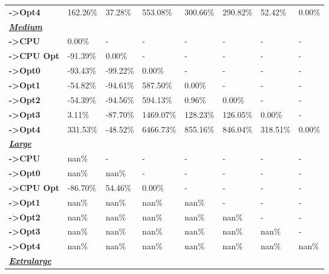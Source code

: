 \begin{table}[H]
\begin{tabular}{llllllll}
    \rowcolor[HTML]{EFEFEF} \cellcolor[HTML]{DAE8FC} \textbf{->Opt4} & 162.26\% & 37.28\% & 553.08\% & 300.66\% & 290.82\% & 	52.42\% & 	0.00\% \\
    \cellcolor[HTML]{DAE8FC} \textbf{\textbf{{\emph{{\underline{{Medium}}}}}}} &  &  &  &  &  &  &  \\
    \rowcolor[HTML]{EFEFEF} \cellcolor[HTML]{DAE8FC} \textbf{->CPU} & 0.00\% & - & - & - & - & - & - \\
    \cellcolor[HTML]{DAE8FC} \textbf{->CPU Opt} & -91.39\% & 0.00\% & - & - & - & - & - \\
    \rowcolor[HTML]{EFEFEF} \cellcolor[HTML]{DAE8FC} \textbf{->Opt0} & -93.43\% & -99.22\% & 0.00\% & - & - & - & - \\
    \cellcolor[HTML]{DAE8FC} \textbf{->Opt1} & -54.82\% & -94.61\% & 587.50\% & 0.00\% & - & - & - \\
    \rowcolor[HTML]{EFEFEF} \cellcolor[HTML]{DAE8FC} \textbf{->Opt2} & -54.39\% & -94.56\% & 594.13\% & 0.96\% & 0.00\% & - & - \\
    \cellcolor[HTML]{DAE8FC} \textbf{->Opt3} & 3.11\% & -87.70\% & 1469.07\% & 128.23\% & 126.05\% & 	0.00\% & - \\
    \rowcolor[HTML]{EFEFEF} \cellcolor[HTML]{DAE8FC} \textbf{->Opt4} & 331.53\% & -48.52\% & 6466.73\% & 855.16\% & 846.04\% & 	318.51\% & 	0.00\% \\
    \cellcolor[HTML]{DAE8FC} \textbf{\textbf{{\emph{{\underline{{Large}}}}}}} &  &  &  &  &  &  &  \\
    \rowcolor[HTML]{EFEFEF} \cellcolor[HTML]{DAE8FC} \textbf{->CPU} & nan\% & - & - & - & - & - & - \\
    \cellcolor[HTML]{DAE8FC} \textbf{->Opt0} & nan\% & nan\% & - & - & - & - & - \\
    \rowcolor[HTML]{EFEFEF} \cellcolor[HTML]{DAE8FC} \textbf{->CPU Opt} & -86.70\% & 54.46\% & 0.00\% & - & - & - & - \\
    \cellcolor[HTML]{DAE8FC} \textbf{->Opt1} & nan\% & nan\% & nan\% & nan\% & - & - & - \\
    \rowcolor[HTML]{EFEFEF} \cellcolor[HTML]{DAE8FC} \textbf{->Opt2} & nan\% & nan\% & nan\% & nan\% & nan\% & - & - \\
    \cellcolor[HTML]{DAE8FC} \textbf{->Opt3} & nan\% & nan\% & nan\% & nan\% & nan\% & 	nan\% & - \\
    \rowcolor[HTML]{EFEFEF} \cellcolor[HTML]{DAE8FC} \textbf{->Opt4} & nan\% & nan\% & nan\% & nan\% & nan\% & 	nan\% & 	nan\% \\
    \cellcolor[HTML]{DAE8FC} \textbf{\textbf{{\emph{{\underline{{Extralarge}}}}}}} &  &  &  &  &  &  &  \\

\end{tabular}
\end{table}

